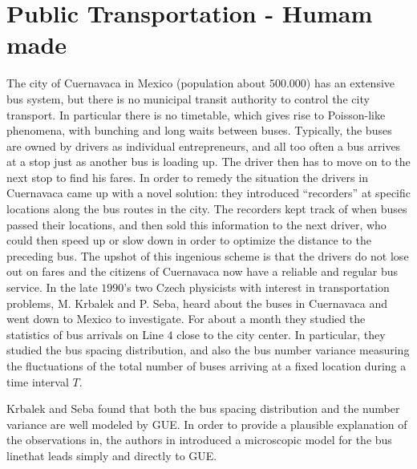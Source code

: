\section{Public Transportation - Humam made}

The city of Cuernavaca in Mexico (population about $500.000$) has an extensive bus system, but there is no municipal transit authority to control the city transport. In particular there is no timetable, which gives rise to Poisson-like phenomena, with bunching and long waits between buses. Typically, the buses are owned by drivers as individual entrepreneurs, and all too often a bus arrives at a stop just as another bus is loading up. The driver then has to move on to the next stop to find his fares. In order to remedy the situation the drivers in Cuernavaca came up with a novel solution: they introduced “recorders” at specific locations along the bus routes in the city. The recorders kept track of when buses passed their locations, and then sold this information to the next driver, who could then speed up or slow down in order to optimize the distance to the preceding bus. The upshot of this ingenious scheme is that the drivers do not lose out on fares and the citizens of Cuernavaca now have a reliable and regular bus service. In the late $1990$’s two Czech physicists with interest in transportation problems, M. Krbalek and P. Seba, heard about the buses in Cuernavaca and went down to Mexico to investigate. For about a month they studied the statistics of bus arrivals on Line $4$ close to the city center. In particular, they studied the bus spacing distribution, and also the bus number variance measuring the fluctuations of the total number of buses arriving at a fixed location during a time interval $T$.

Krbalek and Seba found that both the bus spacing distribution and the number
variance are well modeled by GUE. In order to provide a plausible explanation of the observations in, the authors in introduced a microscopic model for the bus linethat leads simply and directly to GUE.

